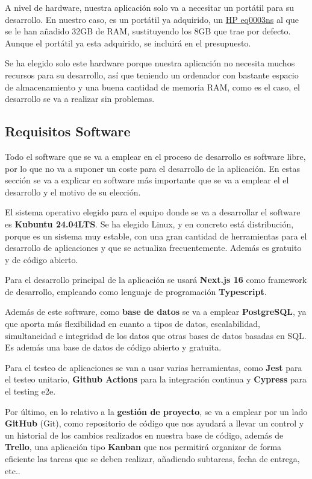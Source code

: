 A nivel de hardware, nuestra aplicación solo va a necesitar un portátil para su desarrollo. En nuestro caso, es un portátil ya adquirido, un \href{https://support.hp.com/uy-es/document/c06645278}{HP eq0003ns} al que se le han añadido 32GB de RAM, sustituyendo los 8GB que trae por defecto. Aunque el portátil ya esta adquirido, se incluirá en el presupuesto.

Se ha elegido solo este hardware porque nuestra aplicación no necesita muchos recursos para su desarrollo, así que teniendo un ordenador con bastante espacio de almacenamiento y una buena cantidad de memoria RAM, como es el caso, el desarrollo se va a realizar sin problemas.

\subsection{Requisitos Software}
Todo el software que se va a emplear en el proceso de desarrollo es software libre, por lo que no va a suponer un coste para el desarrollo de la aplicación. En estas sección se va a explicar en software más importante que se va a emplear el el desarrollo y el motivo de su elección.

El sistema operativo elegido para el equipo donde se va a desarrollar el software es \textbf{Kubuntu 24.04LTS}. Se ha elegido Linux, y en concreto está distribución, porque es un sistema muy estable, con una gran cantidad de herramientas para el desarrollo de aplicaciones y que se actualiza frecuentemente. Además es gratuito y de código abierto.

Para el desarrollo principal de la aplicación se usará \textbf{Next.js 16} como framework de desarrollo, empleando como lenguaje de programación \textbf{Typescript}.

Además de este software, como \textbf{base de datos} se va a emplear \textbf{PostgreSQL}, ya que aporta más flexibilidad en cuanto a tipos de datos, escalabilidad, simultaneidad e integridad de los datos que otras bases de datos basadas en SQL. Es además una base de datos de código abierto y gratuita.

Para el testeo de aplicaciones se van a usar varias herramientas, como \textbf{Jest} para el testeo unitario, \textbf{Github Actions} para la integración continua y \textbf{Cypress} para el testing e2e.

Por último, en lo relativo a la \textbf{gestión de proyecto}, se va a emplear por un lado \textbf{GitHub} (Git), como repositorio de código que nos ayudará a llevar un control y un historial de los cambios realizados en nuestra base de código, además de \textbf{Trello}, una aplicación tipo \textbf{Kanban} que nos permitirá organizar de forma eficiente las tareas que se deben realizar, añadiendo subtareas, fecha de entrega, etc.. 

